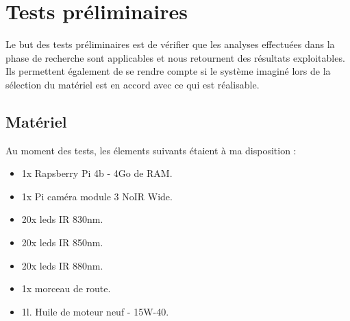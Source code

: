 \section{Tests préliminaires \label{test_vision}}
Le but des tests préliminaires est de vérifier que les analyses effectuées dans la phase de recherche sont applicables et nous retournent
des résultats exploitables. Ils permettent également de se rendre compte si le système imaginé lors de la sélection du matériel est en accord avec
ce qui est réalisable.
\subsection{Matériel}
Au moment des tests, les élements suivants étaient à ma disposition :
\begin{itemize}
    \item 1x Rapsberry Pi 4b - 4Go de RAM.
    \item 1x Pi caméra module 3 NoIR Wide.
    \item 20x leds IR 830nm.
    \item 20x leds IR 850nm.
    \item 20x leds IR 880nm.
    \item 1x morceau de route.
    \item 1l. Huile de moteur neuf - 15W-40.
\end{itemize}

